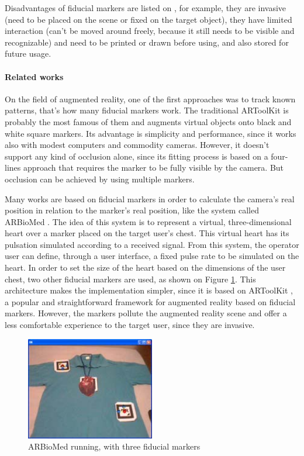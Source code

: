 \documentclass[msc, a4paper, classic, en]{ufbathesis}
\begin{document}
Disadvantages of fiducial markers are listed on \cite{dolz}, for example, they are invasive (need to be placed on the scene or fixed on the target object), they have limited interaction (can't be moved around freely, because it still needs to be visible and recognizable) and need to be printed or drawn before using, and also stored for future usage.

\paragraph{Related works}

On the field of augmented reality, one of the first approaches was to track known patterns, that's how many fiducial markers work. The traditional ARToolKit \cite{artoolkit} is probably the most famous of them and augments virtual objects onto black and white square markers. Its advantage is simplicity and performance, since it works also with modest computers and commodity cameras. However, it doesn't support any kind of occlusion alone, since its fitting process is based on a four-lines approach that requires the marker to be fully visible by the camera. But occlusion can be achieved by using multiple markers.

Many works are based on fiducial markers in order to calculate the camera's real position in relation to the marker's real position, like the system called ARBioMed \cite{arbiomed}. The idea of this system is to represent a virtual, three-dimensional heart over a marker placed on the target user's chest. This virtual heart has its pulsation simulated according to a received signal. From this system, the operator user can define, through a user interface, a fixed pulse rate to be simulated on the heart. In order to set the size of the heart based on the dimensions of the user chest, two other fiducial markers are used, as shown on Figure \ref{fig:arbiomed}. This architecture makes the implementation simpler, since it is based on ARToolKit \cite{artoolkit}, a popular and straightforward framework for augmented reality based on fiducial markers. However, the markers pollute the augmented reality scene and offer a less comfortable experience to the target user, since they are invasive.

\begin{figure}
\centering
\includegraphics[width=0.5\textwidth]{images/arbiomed.png}
\caption{ARBioMed running, with three fiducial markers \cite{arbiomed}}
\label{fig:arbiomed}
\end{figure}
\end{document}

